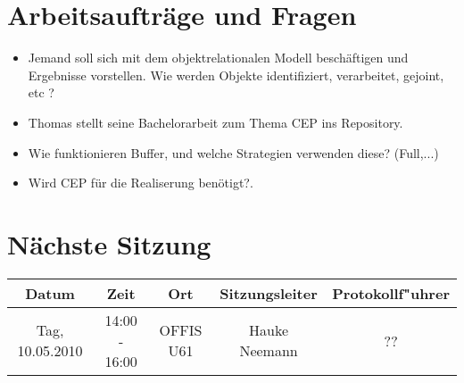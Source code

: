\documentclass[pdftex,a4paper]{scrartcl}
\begin{document}
\section{Arbeitsauftr\"age und Fragen}
\begin{itemize}
	\item Jemand soll sich mit dem objektrelationalen Modell besch\"aftigen und Ergebnisse vorstellen. Wie werden Objekte identifiziert, verarbeitet, gejoint, etc ?
	\item Thomas stellt seine Bachelorarbeit zum Thema CEP ins Repository.
 	\item Wie funktionieren Buffer, und welche Strategien verwenden diese? (Full,...)
	\item Wird CEP f\"ur die Realiserung ben\"otigt?.
\end{itemize}

\section{N\"achste Sitzung}
	\begin{tabular}{|c|c|c|c|c|}
		\hline 
		Datum & Zeit & Ort & Sitzungsleiter & Protokollf"uhrer\\
		\hline 
		Tag, 10.05.2010 & 14:00 - 16:00 & OFFIS U61 & Hauke Neemann & ??	\\
		\hline
	\end{tabular}
\end{document}
